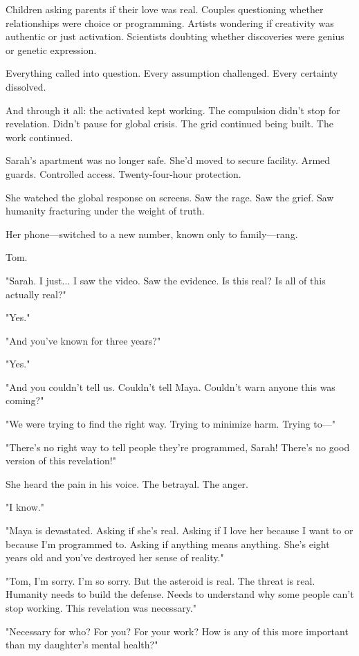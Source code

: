 Children asking parents if their love was real. Couples questioning whether relationships were choice or programming. Artists wondering if creativity was authentic or just activation. Scientists doubting whether discoveries were genius or genetic expression.

Everything called into question. Every assumption challenged. Every certainty dissolved.

And through it all: the activated kept working. The compulsion didn't stop for revelation. Didn't pause for global crisis. The grid continued being built. The work continued.

\scenebreak

Sarah's apartment was no longer safe. She'd moved to secure facility. Armed guards. Controlled access. Twenty-four-hour protection.

She watched the global response on screens. Saw the rage. Saw the grief. Saw humanity fracturing under the weight of truth.

Her phone—switched to a new number, known only to family—rang.

Tom.

"Sarah. I just... I saw the video. Saw the evidence. Is this real? Is all of this actually real?"

"Yes."

"And you've known for three years?"

"Yes."

"And you couldn't tell us. Couldn't tell Maya. Couldn't warn anyone this was coming?"

"We were trying to find the right way. Trying to minimize harm. Trying to—"

"There's no right way to tell people they're programmed, Sarah! There's no good version of this revelation!"

She heard the pain in his voice. The betrayal. The anger.

"I know."

"Maya is devastated. Asking if she's real. Asking if I love her because I want to or because I'm programmed to. Asking if anything means anything. She's eight years old and you've destroyed her sense of reality."

"Tom, I'm sorry. I'm so sorry. But the asteroid is real. The threat is real. Humanity needs to build the defense. Needs to understand why some people can't stop working. This revelation was necessary."

"Necessary for who? For you? For your work? How is any of this more important than my daughter's mental health?"

